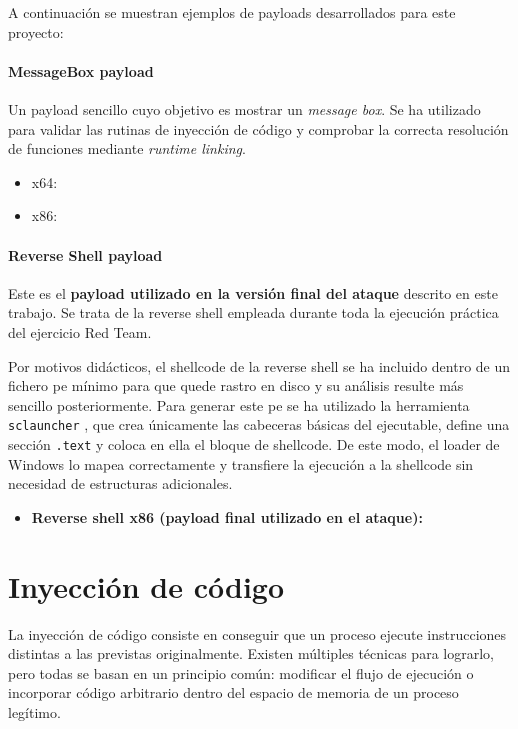 A continuación se muestran ejemplos de payloads desarrollados para este proyecto:

\paragraph{MessageBox payload}  
Un payload sencillo cuyo objetivo es mostrar un \textit{message box}. Se ha utilizado para validar las rutinas de inyección de código y comprobar la correcta resolución de funciones mediante \textit{runtime linking}.

\begin{itemize}
    \item x64: \cite{github-messagebox-x64}
    \item x86: \cite{github-messagebox-x86}
\end{itemize}

\paragraph{Reverse Shell payload}
Este es el \textbf{payload utilizado en la versión final del ataque} descrito en este trabajo. Se trata de la reverse shell empleada durante toda la ejecución práctica del ejercicio Red Team.

Por motivos didácticos, el shellcode de la reverse shell se ha incluido dentro de un fichero \acrshort{pe} mínimo para que quede rastro en disco y su análisis resulte más sencillo posteriormente.
Para generar este \acrshort{pe} se ha utilizado la herramienta \texttt{sclauncher} \cite{sclauncher}, que crea únicamente las cabeceras básicas del ejecutable, define una sección \texttt{.text} y coloca en ella el bloque de shellcode. De este modo, el loader de Windows lo mapea correctamente y transfiere la ejecución a la shellcode sin necesidad de estructuras adicionales.

\begin{itemize}
\item \textbf{Reverse shell x86 (payload final utilizado en el ataque):} \cite{github-reverseshell-x86}
\end{itemize}

\section{Inyección de código} \label{sec:inyeccion}

La inyección de código consiste en conseguir que un proceso ejecute instrucciones distintas a las previstas originalmente. Existen múltiples técnicas para lograrlo, pero todas se basan en un principio común: modificar el flujo de ejecución o incorporar código arbitrario dentro del espacio de memoria de un proceso legítimo.

